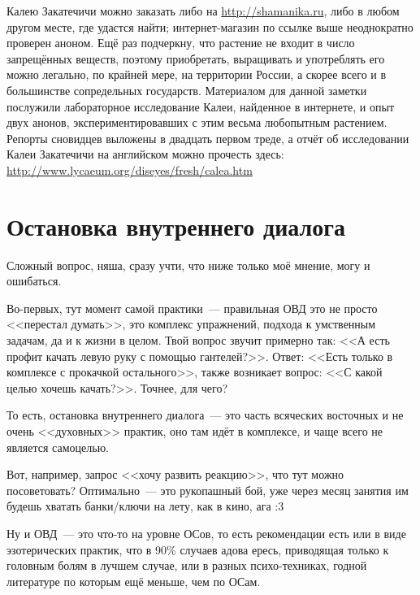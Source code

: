 \documentclass[a4paper,14pt,oneside]{memoir}
\begin{document}
Калею Закатечичи можно заказать либо на \url{http://shamanika.ru}, либо в любом другом месте, где удастся найти; интернет-магазин по ссылке выше неоднократно проверен аноном. Ещё раз подчеркну, что растение не входит в число запрещённых веществ, поэтому приобретать, выращивать и употреблять его можно легально, по крайней мере, на территории России, а скорее всего и в большинстве сопредельных государств. Материалом для данной заметки послужили лабораторное исследование Калеи, найденное в интернете, и опыт двух анонов, экспериментировавших с этим весьма любопытным растением. Репорты сновидцев выложены в двадцать первом треде, а отчёт об исследовании Калеи Закатечичи на английском можно прочесть здесь: \url{http://www.lycaeum.org/diseyes/fresh/calea.htm}



\section{Остановка внутреннего диалога}

\medskip
Сложный вопрос, няша, сразу учти, что ниже только моё мнение, могу и ошибаться. 

Во-первых, тут момент самой практики~--- правильная ОВД это не просто <<перестал думать>>, это комплекс упражнений, подхода к умственным задачам, да и к жизни в целом. Твой вопрос звучит примерно так: <<А есть профит качать левую руку с помощью гантелей?>>. Ответ: <<Есть только в комплексе с прокачкой остального>>, также возникает вопрос: <<С какой целью хочешь качать?>>. Точнее, для чего?

То есть, остановка внутреннего диалога~--- это часть всяческих восточных и не очень <<духовных>> практик, оно там идёт в комплексе, и чаще всего не является самоцелью.

Вот, например, запрос <<хочу развить реакцию>>, что тут можно посоветовать? Оптимально~--- это рукопашный бой, уже через месяц занятия им будешь хватать банки/ключи на лету, как в кино, ага :3 

Ну и ОВД~--- это что-то на уровне ОСов, то есть рекомендации есть или в виде эзотерических практик, что в 90\% случаев адова ересь, приводящая только к головным болям в лучшем случае, или в разных психо-техниках, годной литературе по которым ещё меньше, чем по ОСам. 
\end{document}
